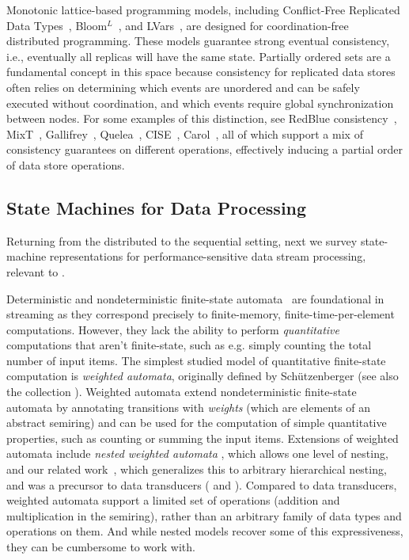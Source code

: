 Monotonic lattice-based programming models,
including Conflict-Free Replicated Data Types~\cite{shapiro2011conflict},
Bloom$^L$~\cite{conway12},
and LVars~\cite{lvars13,lvars14},
are designed for coordination-free distributed programming.
These models guarantee strong eventual consistency,
i.e., eventually all replicas will have the same state.
Partially ordered sets are a fundamental concept in this space
because consistency for replicated data stores
often relies on determining which events are unordered and can be
safely executed without coordination,
and which events require global synchronization between nodes.
For some examples of this distinction,
see RedBlue consistency~\cite{li2012making},
MixT~\cite{milano2018mixt},
Gallifrey~\cite{milano2019tour},
Quelea~\cite{sivaramakrishnan2015declarative},
CISE~\cite{gotsman16},
Carol~\cite{lewchenko2019sequential},
all of which support a mix of consistency guarantees on different operations,
effectively inducing a partial order of data store operations.

\subsection{State Machines for Data Processing}

Returning from the distributed to the sequential setting,
next we survey state-machine representations for performance-sensitive
data stream processing, relevant to .

Deterministic and nondeterministic finite-state automata~\cite{rabin1959finite} are foundational in streaming as they correspond precisely to finite-memory, finite-time-per-element computations. However, they lack the ability to perform \emph{quantitative} computations that aren't finite-state, such as e.g. simply counting the total number of input items.
The simplest studied model of quantitative finite-state computation is
\emph{weighted automata}, originally defined by Schützenberger \cite{S1961WA} (see also the collection \cite{DKV2009HWA}).
Weighted automata extend nondeterministic finite-state automata by annotating transitions with \emph{weights} (which are elements of an abstract semiring) and can be used for the computation of simple quantitative properties, such as counting or summing the input items.
Extensions of weighted automata include \emph{nested weighted automata} \cite{CHO2015NWA}, which allows one level of nesting, and our related work~, which generalizes this to arbitrary hierarchical nesting, and was a precursor to data transducers ( and ).
Compared to data transducers, weighted automata support a limited set of operations (addition and multiplication in the semiring), rather than an arbitrary family of data types and operations on them.
And while nested models recover some of this expressiveness, they can be cumbersome to work with.

